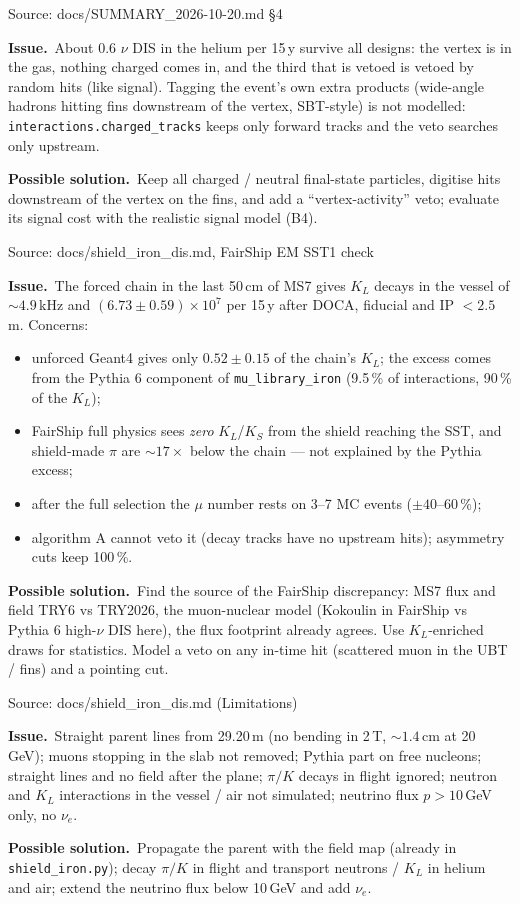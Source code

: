 \documentclass[10pt,a4paper]{article}
\newcommand{\st}[1]{\textbf{#1}}
\newcommand{\stOPEN}{\textcolor{shorange}{\st{OPEN}}}
\newenvironment{issue}[5]{%
  \begin{tcolorbox}[breakable,colback=white,colframe=cernblue,boxrule=0.6pt,arc=1.5mm,
    left=6pt,right=6pt,top=4pt,bottom=4pt,
    title={\textbf{#1}\quad #2\hfill{\normalfont\small priority #3\quad\colorbox{white}{#4}}},
    coltitle=white,colbacktitle=cernblue,fonttitle=\normalsize]
  {\color{greytxt}\footnotesize Source: #5}\par\smallskip}{\end{tcolorbox}\vspace{2pt}}
\newcommand{\prob}{\par\noindent\textbf{\color{cernblue}Issue.}\ }
\newcommand{\sol}{\par\smallskip\noindent\textbf{\color{shorange}Possible solution.}\ }
\begin{document}
\begin{issue}{D2}{Neutrino DIS in helium: irreducible for an upstream veto}{B}{\stOPEN}{docs/SUMMARY\_2026-10-20.md \S4}
\prob About 0.6 $\nu$ DIS in the helium per 15\,y survive all designs: the vertex is in the gas, nothing charged
comes in, and the third that is vetoed is vetoed by random hits (like signal). Tagging the event's own extra
products (wide-angle hadrons hitting fins downstream of the vertex, SBT-style) is not modelled:
\texttt{interactions.charged\_tracks} keeps only forward tracks and the veto searches only upstream.
\sol Keep all charged / neutral final-state particles, digitise hits downstream of the vertex on the fins, and add
a ``vertex-activity'' veto; evaluate its signal cost with the realistic signal model (B4).
\end{issue}

\begin{issue}{D3}{MS7 shield DIS $\to K_L$: chain disagrees with FairShip}{B}{\stOPEN}{docs/shield\_iron\_dis.md, FairShip EM SST1 check}
\prob The forced chain in the last 50\,cm of MS7 gives $K_L$ decays in the vessel of $\sim4.9$\,kHz and
$(6.73\pm0.59)\times10^7$ per 15\,y after DOCA, fiducial and IP $<2.5$\,m. Concerns:
\begin{itemize}
\item unforced Geant4 gives only $0.52\pm0.15$ of the chain's $K_L$; the excess comes from the Pythia 6
      component of \texttt{mu\_library\_iron} (9.5\,\% of interactions, 90\,\% of the $K_L$);
\item FairShip full physics sees \emph{zero} $K_L$/$K_S$ from the shield reaching the SST, and shield-made
      $\pi$ are $\sim17\times$ below the chain --- not explained by the Pythia excess;
\item after the full selection the $\mu$ number rests on 3--7 MC events ($\pm40$--60\,\%);
\item algorithm A cannot veto it (decay tracks have no upstream hits); asymmetry cuts keep 100\,\%.
\end{itemize}
\sol Find the source of the FairShip discrepancy: MS7 flux and field TRY6 vs TRY2026, the muon-nuclear model
(Kokoulin in FairShip vs Pythia 6 high-$\nu$ DIS here), the flux footprint already agrees. Use $K_L$-enriched
draws for statistics. Model a veto on any in-time hit (scattered muon in the UBT / fins) and a pointing cut.
\end{issue}

\begin{issue}{D4}{MS7 shield DIS chain: simplifications}{C}{\stOPEN}{docs/shield\_iron\_dis.md (Limitations)}
\prob Straight parent lines from 29.20\,m (no bending in 2\,T, $\sim1.4$\,cm at 20\,GeV); muons stopping in the
slab not removed; Pythia part on free nucleons; straight lines and no field after the plane; $\pi/K$ decays in
flight ignored; neutron and $K_L$ interactions in the vessel / air not simulated; neutrino flux $p>10$\,GeV only,
no $\nu_e$.
\sol Propagate the parent with the field map (already in \texttt{shield\_iron.py}); decay $\pi/K$ in flight
and transport neutrons / $K_L$ in helium and air; extend the neutrino flux below 10\,GeV and add $\nu_e$.
\end{issue}
\end{document}
